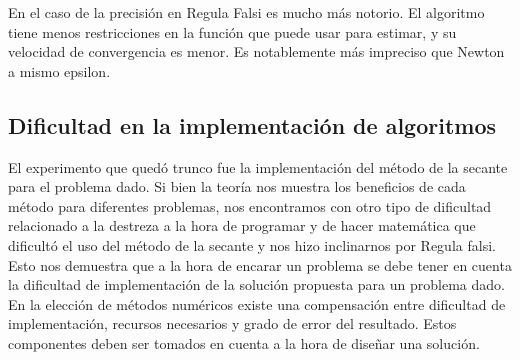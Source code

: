 En el caso de la precisi\'on en Regula Falsi es mucho m\'as notorio. El algoritmo tiene menos restricciones en 
la funci\'on que puede usar para estimar, y su velocidad de convergencia es menor. Es notablemente m\'as impreciso
que Newton a mismo epsilon.

\subsection{Dificultad en la implementaci\'on de algoritmos}

El experimento que qued\'o trunco fue la implementaci\'on del m\'etodo de la secante para el problema dado. Si bien la teor\'ia nos muestra los beneficios de cada m\'etodo para diferentes problemas, nos encontramos con otro tipo de dificultad relacionado a la destreza a la hora de programar y de hacer matem\'atica que dificult\'o el uso del m\'etodo de la secante y nos hizo inclinarnos por Regula falsi. Esto nos demuestra que a la hora de encarar un problema se debe tener en cuenta la dificultad de implementaci\'on de la soluci\'on propuesta para un problema dado. En la elecci\'on de m\'etodos num\'ericos existe una compensaci\'on entre dificultad de implementaci\'on, recursos necesarios y grado de error del resultado. Estos componentes deben ser tomados en cuenta a la hora de dise\~nar una soluci\'on.
